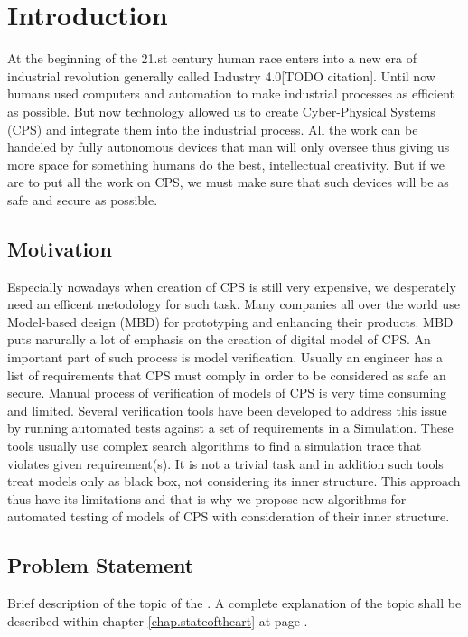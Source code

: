 \chapter{Introduction}
\enlargethispage*{5pt}

At the beginning of the 21.st century human race enters into a new era of industrial revolution generally called Industry 4.0[TODO citation]. Until now humans used computers and automation to make industrial processes as efficient as possible. But now technology allowed us to create Cyber-Physical Systems (CPS) and integrate them into the industrial process. All the work can be handeled by fully autonomous devices that man will only oversee thus giving us more space for something humans do the best, intellectual creativity. But if we are to put all the work on CPS, we must make sure that such devices will be as safe and secure as possible.

\section{Motivation}
Especially nowadays when creation of CPS is still very expensive, we desperately need an efficent metodology for such task. Many companies all over the world use Model-based design (MBD) for prototyping and enhancing their products. MBD puts narurally a lot of emphasis on the creation of digital model of CPS. An important part of such process is model verification. Usually an engineer has a list of requirements that CPS must comply in order to be considered as safe an secure. Manual process of verification of models of CPS is very time consuming and limited. Several verification tools have been developed to address this issue by running automated tests against a set of requirements in a Simulation. These tools usually use complex search algorithms to find a simulation trace that violates given requirement(s). It is not a trivial task and in addition such tools treat models only as black box, not considering its inner structure. This approach thus have its limitations and that is why we propose new algorithms for automated testing of models of CPS with consideration of their inner structure.


\section{Problem Statement}
Brief description of the topic of the \thesis. A complete explanation of the topic shall be described within chapter \ref{chap.stateoftheart} at page \pageref{chap.stateoftheart}.

